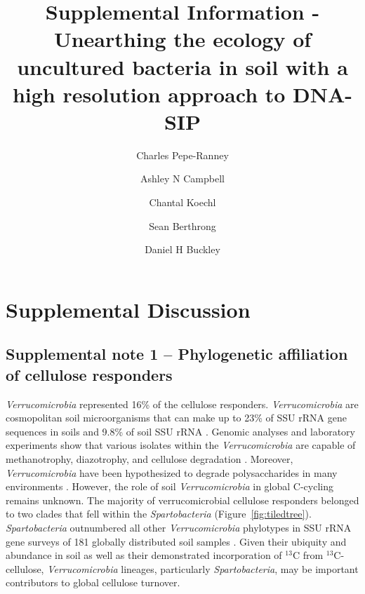 \documentclass{article}
\title{Supplemental Information - Unearthing the ecology of uncultured bacteria in soil with a high resolution approach to DNA-SIP}
\author[1,*]{Charles Pepe-Ranney}
\author[1,*]{Ashley N Campbell}
\author[1]{Chantal Koechl}
\author[2]{Sean Berthrong}
\author[1,**]{Daniel H Buckley}
\affil[1]{School of Integrative Plant Science, Cornell University}
\affil[*]{co-first authors}
\affil[2]{Department of Biological Sciences, Butler University}
\affil[**]{Corresponding Author}
\date{\vspace{-5ex}}
\begin{document}
\maketitle

\linenumbers

\tableofcontents



\section{Supplemental Discussion}
\subsection{Supplemental note 1 -- Phylogenetic affiliation of cellulose responders}
\textit{Verrucomicrobia} represented 16\% of the cellulose responders.
\textit{Verrucomicrobia} are cosmopolitan soil microorganisms \citep{Bergmann_2011}
that can make up to 23\% of SSU rRNA gene sequences in soils
\citep{Bergmann_2011} and 9.8\% of soil SSU rRNA \citep{Buckley_2001}. Genomic
analyses and laboratory experiments show that various isolates within the
\textit{Verrucomicrobia} are capable of methanotrophy, diazotrophy, and
cellulose degradation \citep{Wertz_2011,Otsuka_2012}. Moreover,
\textit{Verrucomicrobia} have been hypothesized to degrade polysaccharides in
many environments \citep{Fierer_2013,10543821,Herlemann_2013}. However, the
role of soil \textit{Verrucomicrobia} in global C-cycling remains unknown. The
majority of verrucomicrobial cellulose responders belonged to two clades that
fell within the \textit{Spartobacteria} (Figure~\ref{fig:tiledtree}).
\textit{Spartobacteria} outnumbered all other \textit{Verrucomicrobia}
phylotypes in SSU rRNA gene surveys of 181 globally distributed soil samples
\citep{Bergmann_2011}. Given their ubiquity and abundance
in soil as well as their demonstrated incorporation of $^{13}$C from
$^{13}$C-cellulose, \textit{Verrucomicrobia} lineages, particularly
\textit{Spartobacteria}, may be important contributors to global cellulose
turnover. 
\end{document}
